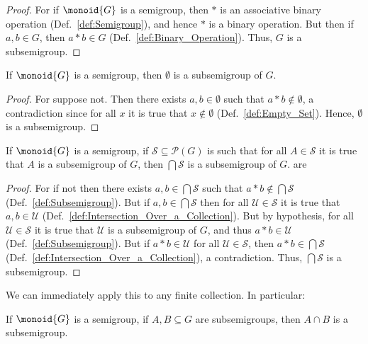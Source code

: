         \begin{proof}
            For if $\monoid{G}$ is a semigroup, then $*$ is an associative
            binary operation (Def.~\ref{def:Semigroup}), and hence $*$ is a
            binary operation. But then if $a,b\in{G}$, then $a*b\in{G}$
            (Def.~\ref{def:Binary_Operation}). Thus, $G$ is a subsemigroup.
        \end{proof}
        \begin{theorem}
            \label{thm:Emptyset_is_Subsemigroup}%
            If $\monoid{G}$ is a semigroup, then $\emptyset$ is a subsemigroup
            of $G$.
        \end{theorem}
        \begin{proof}
            For suppose not. Then there exists $a,b\in\emptyset$ such that
            $a*b\notin\emptyset$, a contradiction since for all $x$ it is true
            that $x\notin\emptyset$ (Def.~\ref{def:Empty_Set}). Hence,
            $\emptyset$ is a subsemigroup.
        \end{proof}
        \begin{theorem}
            \label{thm:Intersection_of_Subsemigroups_is_Subsemigroup}%
            If $\monoid{G}$ is a semigroup, if
            $\mathcal{S}\subseteq\mathcal{P}(G)$ is such that for all
            $A\in\mathcal{S}$ it is true that $A$ is a subsemigroup of $G$,
            then $\bigcap\mathcal{S}$ is a subsemigroup of $G$. are
        \end{theorem}
        \begin{proof}
            For if not then there exists $a,b\in\bigcap\mathcal{S}$ such that
            $a*b\notin\bigcap\mathcal{S}$ (Def.~\ref{def:Subsemigroup}). But if
            $a,b\in\bigcap\mathcal{S}$ then for all $\mathcal{U}\in\mathcal{S}$
            it is true that $a,b\in\mathcal{U}$
            (Def.~\ref{def:Intersection_Over_a_Collection}). But by hypothesis,
            for all $\mathcal{U}\in\mathcal{S}$ it is true that $\mathcal{U}$
            is a subsemigroup of $G$, and thus $a*b\in\mathcal{U}$
            (Def.~\ref{def:Subsemigroup}). But if $a*b\in\mathcal{U}$ for all
            $\mathcal{U}\in\mathcal{S}$, then $a*b\in\bigcap\mathcal{S}$
            (Def.~\ref{def:Intersection_Over_a_Collection}), a contradiction.
            Thus, $\bigcap\mathcal{S}$ is a subsemigroup.
        \end{proof}
        We can immediately apply this to any finite collection. In particular:
        \begin{theorem}
            \label{thm:Intersection_of_Two_Subsemigroups_is_Subsemigroup}%
            If $\monoid{G}$ is a semigroup, if $A,B\subseteq{G}$ are
            subsemigroups, then $A\cap{B}$ is a subsemigroup.
        \end{theorem}
